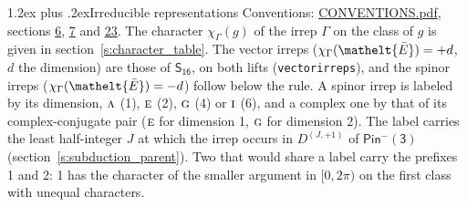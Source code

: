 \documentclass[10pt,a4paper]{article}
\makeatletter
\renewcommand\section{\@startsection{section}{1}{\z@}{-3ex plus -1ex minus -.2ex}%
  {1.2ex plus .2ex}{\normalfont\large\sffamily\bfseries\color{parttitle}}}
\numberwithin{equation}{section}
\newcommand{\eltfont}[1]{{\let\sigma\eltsigma\mathelt{#1}}}
\newcommand{\grp}[1]{\mathsf{#1}}
\newcommand{\irr}[1]{\text{\normalfont\scshape #1}}
\newcommand{\elt}[1]{\eltfont{#1}}
\newcommand{\irrJp}[2]{D^{(#1,#2)}}
\newcommand{\irchar}[1]{\chi_{#1}}
\newcommand{\barred}[1]{\bar{#1}}
\makeatother
\begin{document}
\section{Irreducible representations}\label{s:irreps}
Conventions: \href{../../CONVENTIONS.pdf}{CONVENTIONS.pdf}, sections \href{../../../rotation/CONVENTIONS.pdf\#conv.6}{6}, \href{../../../rotation/CONVENTIONS.pdf\#conv.7}{7} and \href{../../CONVENTIONS.pdf\#conv.23}{23}.
\leavevmode\label{n:function.character}\label{n:irrep.Gamma}The character $\irchar{\Gamma}(g)$ of the irrep $\Gamma$ on the class of $g$ is given in section~\ref{s:character_table}. \label{n:index.dimension}The vector irreps ($\irchar{\Gamma}(\elt{\barred{E}}) = +d$, $d$ the dimension) are those of \href{../../../rotation/data/pdf/S16.pdf}{$\grp{S_{16}}$}, on both lifts (\texttt{vectorirreps}), and the spinor irreps ($\irchar{\Gamma}(\elt{\barred{E}}) = -d$) follow below the rule. A spinor irrep is labeled by its dimension, $\irr{a}$ (1), $\irr{e}$ (2), $\irr{g}$ (4) or $\irr{i}$ (6), and a complex one by that of its complex-conjugate pair ($\irr{e}$ for dimension 1, $\irr{g}$ for dimension 2). The label carries the least half-integer $J$ at which the irrep occurs in $\irrJp{J}{+1}$ of $\grp{Pin^{-}(3)}$ (section~\ref{s:subduction_parent}). Two that would share a label carry the prefixes 1 and 2: 1 has the character of the smaller argument in $[0, 2\pi)$ on the first class with unequal characters.
\end{document}
